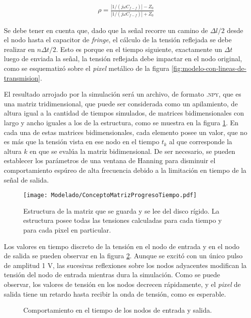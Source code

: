 \begin{align}
	\rho =   \frac{|1/(j\omega C_{f-f})| - Z_0}{|1/(j\omega C_{f-f})| + Z_0}
\end{align}

Se debe tener en cuenta que, dado que la señal recorre un camino de $\Delta l / 2$ desde el nodo hasta el capacitor de \textit{fringe}, el cálculo de la tensión reflejada se debe realizar en $n\Delta t/2$. Esto es porque en el tiempo siguiente, exactamente un $\Delta t$ luego de enviada la señal, la tensión reflejada debe impactar en el nodo original, como se esquematizó sobre el \textit{pixel} metálico de la figura \ref{fig:modelo-con-lineas-de-transmision}.

El resultado arrojado por la simulación será un archivo, de formato \textsc{.npy}, que es una matriz tridimensional, que puede ser considerada como un apilamiento, de altura igual a la cantidad de tiempos simulados, de matrices bidimensionales con largo y ancho iguales a los de la estructura, como se muestra en la figura \ref{fig:EstructuraTiemposMatrizNumpy}. En cada una de estas matrices bidimensionales, cada elemento posee un valor, que no es más que la tensión vista en ese nodo en el tiempo $t_k$ al que corresponde la altura $k$ en que se evalúa la matriz bidimensional. De ser necesario, se pueden establecer los parámetros de una ventana de Hanning para disminuir el comportamiento espúreo de alta frecuencia debido a la limitación en tiempo de la señal de salida.

\begin{figure}[h]
	\centering
	\texttt{[image: Modelado/ConceptoMatrizProgresoTiempo.pdf]}
	\caption{Estructura de la matriz que se guarda y se lee del disco rígido. La estructura posee todas las tensiones calculadas para cada tiempo y para cada pixel en particular.}
	\label{fig:EstructuraTiemposMatrizNumpy}
\end{figure}

Los valores en tiempo discreto de la tensión en el nodo de entrada y en el nodo de salida se pueden observar en la figura \ref{fig:tlm_tiempo}. Aunque se excitó con un único pulso de amplitud 1 V, las sucesivas reflexiones sobre los nodos adyacentes modifican la tensión del nodo de entrada mientras dura la simulación. Como se puede observar, los valores de tensión en los nodos decrecen rápidamente, y el \textit{pixel} de salida tiene un retardo hasta recibir la onda de tensión, como es esperable.


\begin{figure}[htp]
	\centering 
	\hspace{0pt}
	\caption{Comportamiento en el tiempo de los nodos de entrada y salida.}
	\label{fig:tlm_tiempo}
\end{figure}


